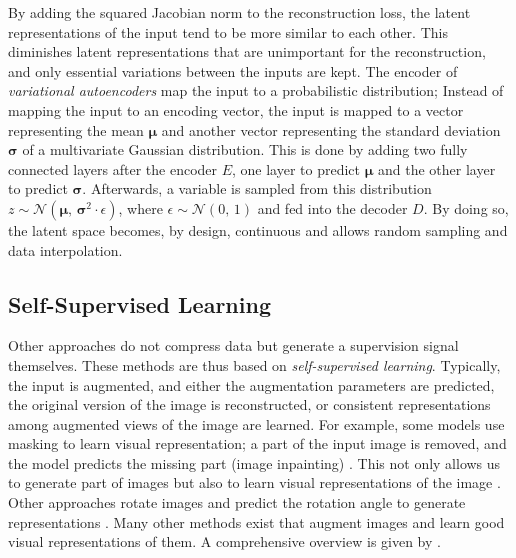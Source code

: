 By adding the squared Jacobian norm to the reconstruction loss, the latent representations of the input tend to be more similar to each other.
This diminishes latent representations that are unimportant for the reconstruction, and only essential variations between the inputs are kept.
The encoder of \emph{variational autoencoders} map the input to a probabilistic distribution; Instead of mapping the input to an encoding vector, the input is mapped to a vector representing the mean $\boldsymbol{\mu}$ and another vector representing the standard deviation $\boldsymbol{\sigma}$ of a multivariate Gaussian distribution.
This is done by adding two fully connected layers after the encoder $E$, one layer to predict $\boldsymbol{\mu}$ and the other layer to predict $\boldsymbol{\sigma}$.
Afterwards, a variable is sampled from this distribution $z \sim \mathcal{N}(\boldsymbol{\mu},\, \boldsymbol{\sigma}^{2} \cdot \epsilon)$, where $\epsilon \sim \mathcal{N}(0,\,1)$  and fed into the decoder $D$.
By doing so, the latent space becomes, by design, continuous and allows random sampling and data interpolation.



\subsection{Self-Supervised Learning}
Other approaches do not compress data but generate a supervision signal themselves.
These methods are thus based on \emph{self-supervised learning}.
Typically, the input is augmented, and either the augmentation parameters are predicted, the original version of the image is reconstructed, or consistent representations among augmented views of the image are learned.
For example, some models use masking to learn visual representation;
a part of the input image is removed, and the model predicts the missing part (image inpainting) \cite{Elharrouss_Almaadeed_Al-Maadeed_Akbari_2020}.
This not only allows us to generate part of images but also to learn visual representations of the image .
Other approaches rotate images and predict the rotation angle to generate representations .
Many other methods exist that augment images and learn good visual representations of them.
A comprehensive overview is given by .

